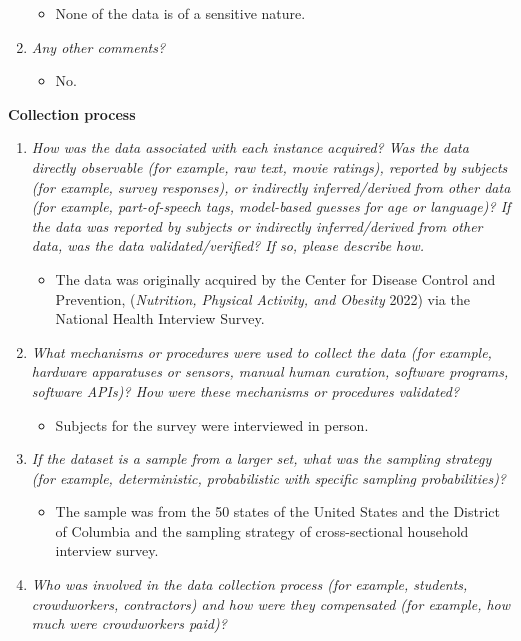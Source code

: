 \documentclass[
]{article}
\providecommand{\tightlist}{%
  \setlength{\itemsep}{0pt}\setlength{\parskip}{0pt}}
\begin{document}
\begin{enumerate}
  \begin{itemize}
  \tightlist
  \item
    None of the data is of a sensitive nature.
  \end{itemize}
\item
  \emph{Any other comments?}

  \begin{itemize}
  \tightlist
  \item
    No.
  \end{itemize}
\end{enumerate}

\newpage

\textbf{Collection process}

\begin{enumerate}
\def\labelenumi{\arabic{enumi}.}
\tightlist
\item
  \emph{How was the data associated with each instance acquired? Was the data directly observable (for example, raw text, movie ratings), reported by subjects (for example, survey responses), or indirectly inferred/derived from other data (for example, part-of-speech tags, model-based guesses for age or language)? If the data was reported by subjects or indirectly inferred/derived from other data, was the data validated/verified? If so, please describe how.}

  \begin{itemize}
  \tightlist
  \item
    The data was originally acquired by the Center for Disease Control and Prevention, (\emph{Nutrition, Physical Activity, and Obesity} 2022) via the National Health Interview Survey.
  \end{itemize}
\item
  \emph{What mechanisms or procedures were used to collect the data (for example, hardware apparatuses or sensors, manual human curation, software programs, software APIs)? How were these mechanisms or procedures validated?}

  \begin{itemize}
  \tightlist
  \item
    Subjects for the survey were interviewed in person.
  \end{itemize}
\item
  \emph{If the dataset is a sample from a larger set, what was the sampling strategy (for example, deterministic, probabilistic with specific sampling probabilities)?}

  \begin{itemize}
  \tightlist
  \item
    The sample was from the 50 states of the United States and the District of Columbia and the sampling strategy of cross-sectional household interview survey.
  \end{itemize}
\item
  \emph{Who was involved in the data collection process (for example, students, crowdworkers, contractors) and how were they compensated (for example, how much were crowdworkers paid)?}


\end{enumerate}
\end{document}
